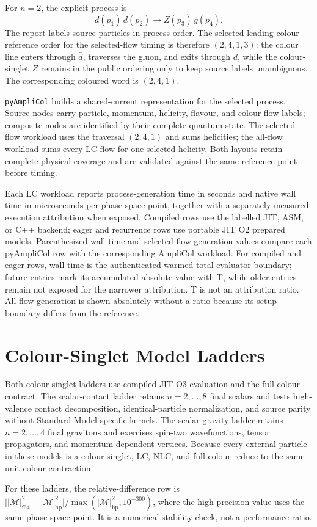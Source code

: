 \documentclass[10pt,letterpaper]{article}
\newif\ifReportLandscapePage
\newcommand{\PAC}{\texttt{pyAmpliCol}}
\newcommand{\ReportTableNote}[1]{\par\smallskip\noindent\footnotesize\textcolor{ReportMuted}{#1}\par}
\newcommand{\ReportLadderLegend}{\ReportTableNote{Each LC workload reports process-generation time in seconds and native wall time in microseconds per phase-space point, together with a separately measured execution attribution when exposed. Compiled rows use the labelled JIT, ASM, or C++ backend; eager and recurrence rows use portable JIT O2 prepared models. Parenthesized wall-time and selected-flow generation values compare each pyAmpliCol row with the corresponding AmpliCol workload. For compiled and eager rows, wall time is the authenticated warmed total-evaluator boundary; future entries mark its accumulated absolute value with T, while older entries remain not exposed for the narrower attribution. T is not an attribution ratio. All-flow generation is shown absolutely without a ratio because its setup boundary differs from the reference.}}
\newcommand{\ReportLandscapeFooter}{}
\begin{document}
\begin{landscape}
For \(n=2\), the explicit process is
\[
  d(p_1)\,\bar d(p_2)\to Z(p_3)\,g(p_4).
\]
The report labels source particles in process order. The selected leading-colour
reference order for the selected-flow timing is therefore \((2,4,1,3)\): the
colour line enters through \(\bar d\), traverses the gluon, and exits through
\(d\), while the colour-singlet \(Z\) remains in the public ordering only to
keep source labels unambiguous. The corresponding coloured word is
\((2,4,1)\).

\PAC{} builds a shared-current representation for the selected process. Source
nodes carry particle, momentum, helicity, flavour, and colour-flow labels;
composite nodes are identified by their complete quantum state. The
selected-flow workload uses the traversal \((2,4,1)\) and sums helicities; the
all-flow workload sums every LC flow for one selected helicity. Both layouts
retain complete physical coverage and are validated against the same reference
point before timing.

\clearpage

\clearpage

\ReportLadderLegend
\ReportLandscapeFooter
\end{landscape}
\ReportLandscapePagefalse
\clearpage
\pagestyle{fancy}

\section{Colour-Singlet Model Ladders}

Both colour-singlet ladders use compiled JIT O3 evaluation and the full-colour
contract. The scalar-contact ladder retains $n=2,\ldots,8$ final scalars and
tests high-valence contact decomposition, identical-particle normalization,
and source parity without Standard-Model-specific kernels. The scalar-gravity
ladder retains $n=2,\ldots,4$ final gravitons and exercises spin-two
wavefunctions, tensor propagators, and momentum-dependent vertices. Because
every external particle in these models is a colour singlet, LC, NLC, and full
colour reduce to the same unit colour contraction.

For these ladders, the relative-difference row is
\(\bigl||\mathcal M|^2_{\mathrm{f64}}-|\mathcal M|^2_{\mathrm{hp}}\bigr|
/\max(|\mathcal M|^2_{\mathrm{hp}},10^{-300})\), where the high-precision value
uses the same phase-space point. It is a numerical stability check, not a
performance ratio.



\end{document}
